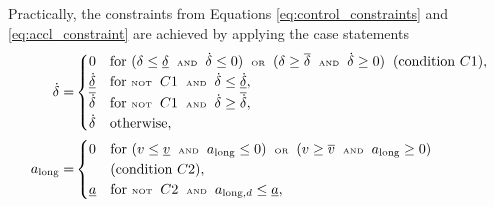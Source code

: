 

Practically, the constraints from Equations \ref{eq:control_constraints} and \ref{eq:accl_constraint} are achieved by applying the case statements 
\begin{equation}
\begin{split}
    \dot{\delta} = 
    &\begin{cases}
    0 & \text{for } (\delta \leq \underline{\delta}  \hspace{0.2cm}\text{\tiny AND}\hspace{0.2cm} \dot{\delta} \leq 0)  \hspace{0.2cm}\text{\tiny OR}\hspace{0.2cm} (\delta \geq \overline{\delta}  \hspace{0.2cm}\text{\tiny AND}\hspace{0.2cm} \dot{\delta} \geq 0) \hspace{0.2cm} (\text{condition } C1), \\
    \underline{\dot{\delta}} & \text{for } \text{\tiny NOT}\hspace{0.2cm} C1 \hspace{0.2cm}\text{\tiny AND}\hspace{0.2cm} \dot{\delta} \leq \underline{\dot{\delta}}, \\
    \overline{\dot{\delta}} & \text{for } \text{\tiny NOT}\hspace{0.2cm} C1 \hspace{0.2cm}\text{\tiny AND}\hspace{0.2cm} \dot{\delta} \geq \overline{\dot{\delta}}, \\
    \dot{\delta} & \text{otherwise},
    \end{cases}\\
    a_{\text{long}} = 
    &\begin{cases}
    0 & \text{for } (v \leq \underline{v} \hspace{0.2cm}\text{\tiny AND}\hspace{0.2cm} a_{\text{long}} \leq 0) \hspace{0.2cm}\text{\tiny OR}\hspace{0.2cm} (v \geq \overline{v} \hspace{0.2cm}\text{\tiny AND}\hspace{0.2cm} a_{\text{long}} \geq 0) \hspace{0.2cm} \\ & (\text{condition } C2), \\
    \underline{a} & \text{for } \text{\tiny NOT}\hspace{0.2cm} C2 \hspace{0.2cm}\text{\tiny AND}\hspace{0.2cm} a_{\text{long},d} \leq \underline{a}, \\

\end{cases}
\end{split}
\end{equation}
